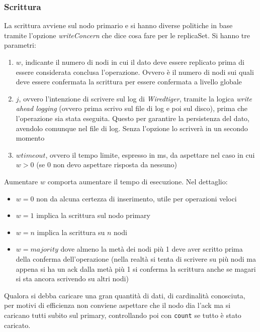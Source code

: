 \documentclass[a4paper,12pt, oneside]{book}
\begin{document}
\subsubsection{Scrittura}
La scrittura avviene sul nodo primario e si hanno diverse politiche in base
tramite l'opzione \textit{writeConcern} che dice cosa fare per le replicaSet.
Si hanno tre parametri:
\begin{enumerate}
  \item $w$, indicante il numero di nodi in cui il dato deve essere replicato
  prima di essere considerata conclusa l’operazione. Ovvero è il numero di nodi
  sui quali deve essere confermata la scrittura per essere confermata a livello
  globale
  \item $j$, ovvero l'intenzione di scrivere sul log di \textit{Wiredtiger},
  tramite la logica \textit{write ahead logging} (ovvero prima scrivo sul file
  di log e poi sul disco), prima che l'operazione sia stata
  eseguita. Questo per garantire la persistenza del dato, avendolo comunque nel
  file di log. Senza l'opzione lo scriverà in un secondo momento
  \item $wtimeout$, ovvero il tempo limite, espresso in ms, da aspettare nel
  caso in cui $w>0$ (se $0$ non devo aspettare risposta da nessuno)
\end{enumerate}
Aumentare $w$ comporta aumentare il tempo di esecuzione. Nel dettaglio:
\begin{itemize}
  \item $w=0$ non da alcuna certezza di inserimento, utile per operazioni veloci
  \item $w=1$ implica la scrittura sul nodo primary
  \item $w=n$ implica la scrittura su $n$ nodi
  \item $w=majority$ dove almeno la metà dei nodi più 1 deve aver scritto prima
  della conferma dell'operazione (nella realtà si tenta di scrivere su più nodi
  ma appena si ha un ack dalla metà più 1 si conferma la scrittura anche se
  magari si sta ancora scrivendo su altri nodi)
\end{itemize}
Qualora si debba caricare una gran quantità di dati, di cardinalità conosciuta,
per motivi di efficienza non conviene aspettare che il nodo dia l'ack ma si
caricano tutti subito sul primary, controllando poi con \texttt{count} se tutto
è stato caricato.
\end{document}
